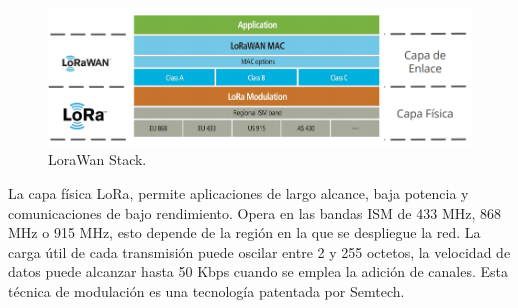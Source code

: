 \begin{figure}[h]
	\centering
	\includegraphics[scale=.55]{./Figures/LoraWanClasses.PNG}
	\caption{LoraWan Stack\protect\footnotemark.}
	\label{fig:LoraStack}
\end{figure}

La capa física LoRa, permite aplicaciones de largo alcance, baja potencia y comunicaciones de bajo rendimiento. Opera en las bandas ISM de 433 MHz, 868 MHz o 915 MHz, esto depende de la región en la que se despliegue la red. La carga útil de cada transmisión puede oscilar entre 2 y 255 octetos, la velocidad de datos puede alcanzar hasta 50 Kbps cuando se emplea la adición de canales. Esta técnica de modulación es una tecnología patentada por Semtech\cite{FEHRI20181096}.

